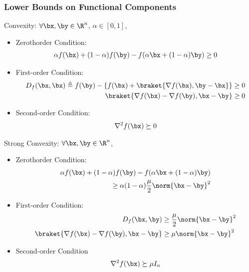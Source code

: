 \subsubsection{Lower Bounds on Functional Components}
Convexity: $\forall \bx,\by\in\R^n$, $\alpha\in[0,1]$,
\begin{itemize}
    \item Zerothorder Condition:
    \begin{align*}
        \alpha f(\bx)+(1-\alpha)f(\by)-f(\alpha \bx+(1-\alpha)\by)\ge 0
    \end{align*}
    \item First-order Condition:
    \begin{align*}
        D_f(\bx,\bx)\triangleq f(\by)-\{ f(\bx)+ \braket{\nabla f(\bx),\by-\bx} \}&\ge 0\\
        \braket{\nabla f(\bx)-\nabla f(\by),\bx-\by}  &\ge 0
    \end{align*}
    \item Second-order Condition:
    \begin{align*}
        \nabla^2 f(\bx)\succeq 0
    \end{align*}
\end{itemize}

Strong Convexity: $\forall \bx,\by\in\R^n$,
\begin{itemize}
    \item Zerothorder Condition:
    \begin{align*}
        \alpha f(\bx)+(1-\alpha)f(\by)-f(\alpha \bx+(1-\alpha)\by)\\
        \ge \alpha(1-\alpha)\frac{\mu}{2}\norm{\bx-\by}^2
    \end{align*}
    \item First-order Condition:
    \begin{align*}
        D_f(\bx,\by) &\ge \frac{\mu}{2}\norm{\bx-\by}^2\\
        \braket{\nabla f(\bx)-\nabla f(\by),\bx-\by}&\ge \mu\norm{\bx-\by}^2
    \end{align*}
    \item Second-order Condition
    \begin{align*}
        \nabla ^2 f(\bx)\succeq \mu I_n
    \end{align*}
\end{itemize}

